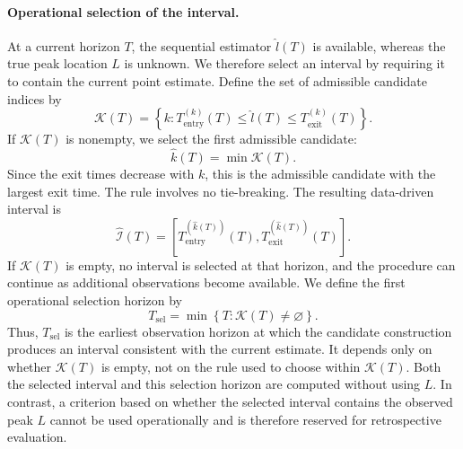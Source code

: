\documentclass[12pt,a4paper]{article}
\begin{document}
\paragraph{Operational selection of the interval.}
At a current horizon \(T\), the sequential estimator \(\widehat l(T)\) is available, whereas the true peak location \(L\) is unknown. We therefore select an interval by requiring it to contain the current point estimate. Define the set of admissible candidate indices by
\begin{equation}
	\mathcal K(T)
	=
	\left\{
	k:
	T_{\mathrm{entry}}^{(k)}(T)
	\leq \widehat l(T)
	\leq T_{\mathrm{exit}}^{(k)}(T)
	\right\}.
	\label{eq:admissible-candidates}
\end{equation}
If $\mathcal K(T)$ is nonempty, we select the first admissible candidate:
\begin{equation}
	\widehat k(T)
	=
	\min\mathcal K(T).
	\label{eq:selected-candidate}
\end{equation}
Since the exit times decrease with $k$, this is the admissible candidate with the largest exit time. The rule involves no tie-breaking. The resulting data-driven interval is
\begin{equation}
	\widehat{\mathcal I}(T)
	=
	\left[
	T_{\mathrm{entry}}^{(\widehat k(T))}(T),
	T_{\mathrm{exit}}^{(\widehat k(T))}(T)
	\right].
	\label{eq:selected-peak-interval}
\end{equation}
If $\mathcal K(T)$ is empty, no interval is selected at that horizon, and the procedure can continue as additional observations become available.
We define the first operational selection horizon by
\begin{equation}
	T_{\mathrm{sel}}
	=
	\min\left\{
	T:
	\mathcal K(T)\neq\varnothing
	\right\}.
	\label{eq:T-sel}
\end{equation}
Thus, $T_{\mathrm{sel}}$ is the earliest observation horizon at which the candidate construction produces an interval consistent with the current estimate. It depends only on whether $\mathcal K(T)$ is empty, not on the rule used to choose within $\mathcal K(T)$. Both the selected interval and this selection horizon are computed without using $L$. In contrast, a criterion based on whether the selected interval contains the observed peak $L$ cannot be used operationally and is therefore reserved for retrospective evaluation.
\end{document}
